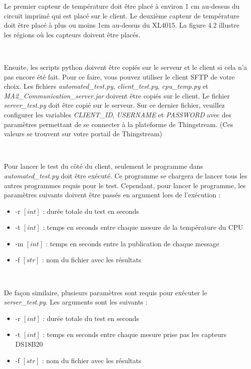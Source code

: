 \noindent
Le premier capteur de température doit être placé à environ 1 cm au-dessus du circuit imprimé qui est placé sur le client. Le deuxième capteur de température doit être placé à plus ou moins 1cm au-dessus du XL4015. La figure 4.2 illustre les régions où les capteurs doivent être placés.

~

\noindent
Ensuite, les scripts python doivent être copiés sur le serveur et le client si cela n'a pas encore été fait. Pour ce faire, vous pouvez utiliser le client SFTP de votre choix. Les fichiers \textit{automated\_test.py}, \textit{client\_test.py}, \textit{cpu\_temp.py} et \textit{MA2\_Communication\_server.jar} doivent être copiés sur le client. Le fichier \textit{server\_test.py} doit être copié sur le serveur. Sur ce dernier fichier, veuillez configurer les variables \textit{CLIENT\_ID}, \textit{USERNAME} et \textit{PASSWORD} avec des paramètres permettant de se connecter à la plateforme de Thingstream. (Ces valeurs se trouvent sur votre portail de Thingstream)

~

\noindent
Pour lancer le test du côté du client, seulement le programme dans \textit{automated\_test.py} doit être exécuté. Ce programme se chargera de lancer tous les autres programmes requis pour le test. Cependant, pour lancer le programme, les paramètres suivants doivent être passés en argument lors de l'exécution :

\begin{itemize}
  \item -r $[int]$ : durée totale du test en seconds
  \item -t $[int]$ : temps en seconds entre chaque mesure de la température du CPU
  \item -m $[int]$ : temps en seconds entre la publication de chaque message
  \item -f $[str]$ : nom du fichier avec les résultats
\end{itemize}

~

\noindent
De façon similaire, plusieurs paramètres sont requis pour exécuter le \textit{serser\_test.py}. Les arguments sont les suivants :

\begin{itemize}
  \item -r $[int]$ : durée totale du test en seconds
  \item -t $[int]$ : temps en seconds entre chaque mesure prise pas les capteurs DS18B20
  \item -f $[str]$ : nom du fichier avec les résultats
\end{itemize}

